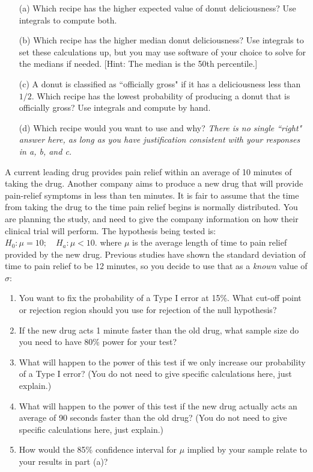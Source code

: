 \documentclass[addpoints]{exam}
\begin{document}
{\begin{questions}
\begin{enumerate}
	\item[(a)] Which recipe has the higher expected value of donut deliciousness? Use integrals to compute both.
	\item[(b)] Which recipe has the higher median donut deliciousness? Use integrals to set these calculations up, but you may use software of your choice to solve for the medians if needed. [Hint: The median is the 50th percentile.]
	\item[(c)] A donut is classified as ``officially gross" if it has a deliciousness less than $1/2$. Which recipe has the lowest probability of producing a donut that is officially gross? Use integrals and compute by hand.
	\item[(d)] Which recipe would you want to use and why? \textit{There is no single ``right" answer here, as long as you have justification consistent with your responses in a, b, and c.}
\end{enumerate}
\clearpage

\question[15] [40 points] A current leading drug provides pain relief within an average of 10 minutes of taking the drug. Another company aims to produce a new drug that will provide pain-relief symptoms in less than ten minutes. It is fair to assume that the time from taking the drug to the time pain relief begins is normally distributed. You are planning the study, and need to give the company information on how their clinical trial will perform. The hypothesis being tested is:\\
$H_0: \mu =10 ; \quad H_a: \mu<10.$
where $\mu$ is the average length of time to pain relief provided by the new drug. Previous studies have shown the standard deviation of time to pain relief to be 12 minutes, so you decide to use that as a \textit{known} value of $\sigma$:

	\begin{enumerate}[label=(\alph*)]
		\item You want to fix the probability of a Type I error at 15\%.  What cut-off point or rejection region should you use for rejection of the null hypothesis?
		\item If the new drug acts 1 minute faster than the old drug, what sample size do you need to have 80\% power for your test?
		\item What will happen to the power of this test if we only increase our probability of a Type I error? 	(You do not need to give specific calculations here, just explain.)
		\item What will happen to the power of this test if the new drug actually acts an average of 90 seconds faster than the old drug? (You do not need to give specific calculations here, just explain.)
		\item How would the 85\% confidence interval for $\mu$ implied by your sample relate to your results in part (a)?
	\end{enumerate}


\end{questions}}
\end{document}
